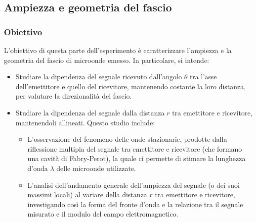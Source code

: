 \documentclass[a4paper]{article}
\begin{document}
\subsection{Ampiezza e geometria del fascio}
\subsubsection{Obiettivo}
L'obiettivo di questa parte dell'esperimento è caratterizzare l'ampiezza e la geometria del fascio di microonde emesso. In particolare, si intende:
\begin{itemize}
    \item Studiare la dipendenza del segnale ricevuto dall'angolo $\theta$ tra l'asse dell'emettitore e quello del ricevitore, mantenendo costante la loro distanza, per valutare la direzionalità del fascio.
    \item Studiare la dipendenza del segnale dalla distanza $r$ tra emettitore e ricevitore, mantenendoli allineati. Questo studio include:
    \begin{itemize}
        \item L'osservazione del fenomeno delle onde stazionarie, prodotte dalla riflessione multipla del segnale tra emettitore e ricevitore (che formano una cavità di Fabry-Perot), la quale ci permette di stimare la lunghezza d'onda $\lambda$ delle microonde utilizzate.
        \item L'analisi dell'andamento generale dell'ampiezza del segnale (o dei suoi massimi locali) al variare della distanza $r$ tra emettitore e ricevitore, investigando così la forma del fronte d'onda e la relazione tra il segnale misurato e il modulo del campo elettromagnetico.
    \end{itemize}
\end{itemize}
\end{document}
